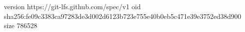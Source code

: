 version https://git-lfs.github.com/spec/v1
oid sha256:fe09c3383ca97283de3d002d6123b723e755e40b0eb5c471e39e3752ed38d900
size 786528
